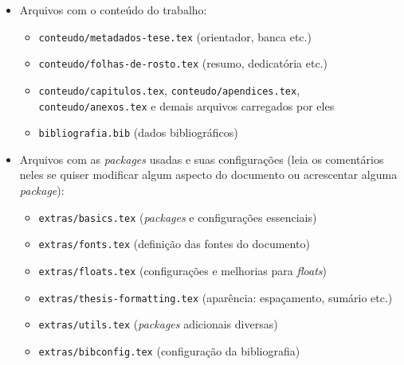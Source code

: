 \begin{itemize}
  \item Arquivos com o conteúdo do trabalho:
  \begin{itemize}
    \item \texttt{conteudo/metadados-tese.tex} (orientador, banca etc.)
    \item \texttt{conteudo/folhas-de-rosto.tex} (resumo, dedicatória etc.)
    \item \texttt{conteudo/capitulos.tex}, \texttt{conteudo/apendices.tex},
          \texttt{conteudo/anexos.tex} e demais arquivos carregados por eles
    \item \texttt{bibliografia.bib} (dados bibliográficos)
  \end{itemize}

  \item Arquivos com as \textit{packages} usadas e suas configurações (leia
        os comentários neles se quiser modificar algum aspecto do
        documento ou acrescentar alguma \textit{package}):
  \begin{itemize}
    \item \texttt{extras/basics.tex} (\textit{packages} e configurações essenciais)
    \item \texttt{extras/fonts.tex} (definição das fontes do documento)
    \item \texttt{extras/floats.tex} (configurações e melhorias para \textit{floats})
    \item \texttt{extras/thesis-formatting.tex} (aparência: espaçamento, sumário etc.)
    \item \texttt{extras/utils.tex} (\textit{packages} adicionais diversas)
    \item \texttt{extras/bibconfig.tex} (configuração da bibliografia)
  \end{itemize}


\end{itemize}
